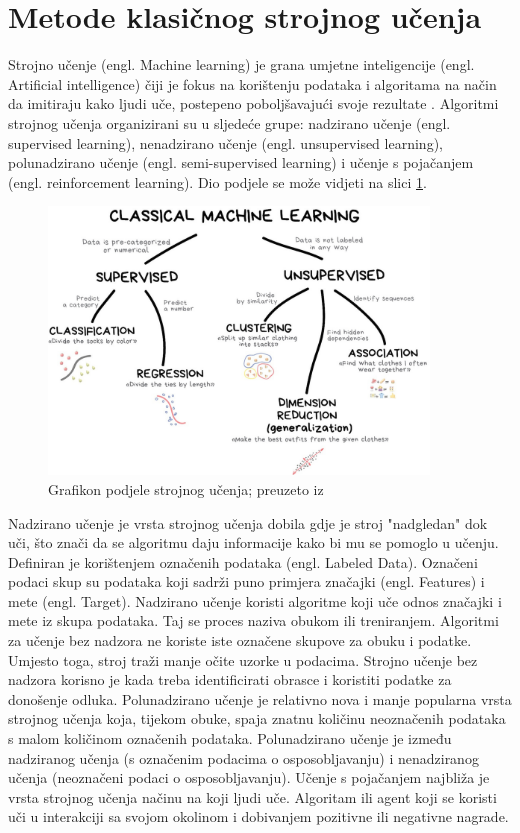 \documentclass[]{foi}
\begin{document}
\section{Metode klasičnog strojnog učenja}
Strojno učenje (engl. Machine learning) je grana umjetne inteligencije (engl. Artificial intelligence) čiji je fokus na korištenju podataka i algoritama na način da imitiraju kako ljudi uče, postepeno poboljšavajući svoje rezultate \cite{ibmcom}. 
Algoritmi strojnog učenja organizirani su u sljedeće grupe: nadzirano učenje (engl. supervised learning), nenadzirano učenje (engl. unsupervised learning), polunadzirano učenje (engl. semi-supervised learning) i učenje s pojačanjem (engl. reinforcement learning). Dio podjele se može vidjeti na slici \ref{fig:machine-graf}.

\begin{figure}[!h]
    \centering
    \includegraphics[width=0.9\textwidth]{slike/machine.jpg}
    \caption{Grafikon podjele strojnog učenja; preuzeto iz \cite{Machine}}
    \label{fig:machine-graf}
\end{figure}

Nadzirano učenje je vrsta strojnog učenja dobila gdje je stroj "nadgledan" dok uči, što znači da se algoritmu daju informacije kako bi mu se pomoglo u učenju. Definiran je korištenjem označenih podataka (engl. Labeled Data). Označeni podaci skup su podataka koji sadrži puno primjera značajki (engl. Features) i mete (engl. Target). Nadzirano učenje koristi algoritme koji uče odnos značajki i mete iz skupa podataka. Taj se proces naziva obukom ili treniranjem. \cite{Coursera2023}
Algoritmi za učenje bez nadzora ne koriste iste označene skupove za obuku i podatke. Umjesto toga, stroj traži manje očite uzorke u podacima. Strojno učenje bez nadzora korisno je kada treba identificirati obrasce i koristiti podatke za donošenje odluka. \cite{Coursera2023}
Polunadzirano učenje je relativno nova i manje popularna vrsta strojnog učenja koja, tijekom obuke, spaja znatnu količinu neoznačenih podataka s malom količinom označenih podataka. Polunadzirano učenje je između nadziranog učenja (s označenim podacima o osposobljavanju) i nenadziranog učenja (neoznačeni podaci o osposobljavanju). \cite{Datacamp}
Učenje s pojačanjem najbliža je vrsta strojnog učenja načinu na koji ljudi uče. Algoritam ili agent koji se koristi uči u interakciji sa svojom okolinom i dobivanjem pozitivne ili negativne nagrade. \cite{Coursera2023}
\end{document}
